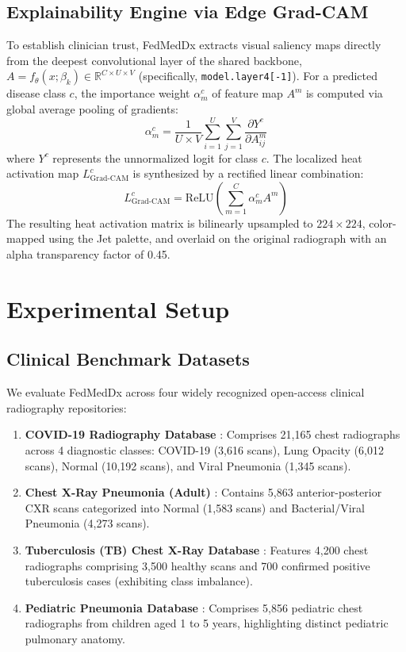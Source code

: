 \documentclass[conference]{IEEEtran}
\newcommand{\compactitems}{%
  \setlength{\itemsep}{1.2pt}%
  \setlength{\parskip}{0pt}%
  \setlength{\parsep}{0pt}%
  \setlength{\topsep}{2pt}%
  \setlength{\partopsep}{0pt}%
}
\begin{document}
\subsection{Explainability Engine via Edge Grad-CAM}
To establish clinician trust, FedMedDx extracts visual saliency maps directly from the deepest convolutional layer of the shared backbone, $A = f_\theta(x; \beta_k) \in \mathbb{R}^{C \times U \times V}$ (specifically, \texttt{model.layer4[-1]}). For a predicted disease class $c$, the importance weight $\alpha_m^c$ of feature map $A^m$ is computed via global average pooling of gradients:
\begin{equation}
    \alpha_m^c = \frac{1}{U \times V} \sum_{i=1}^U \sum_{j=1}^V \frac{\partial Y^c}{\partial A_{ij}^m}
\end{equation}
where $Y^c$ represents the unnormalized logit for class $c$. The localized heat activation map $L_{\text{Grad-CAM}}^c$ is synthesized by a rectified linear combination:
\begin{equation}
    L_{\text{Grad-CAM}}^c = \text{ReLU}\left(\sum_{m=1}^C \alpha_m^c A^m\right)
\end{equation}
The resulting heat activation matrix is bilinearly upsampled to $224 \times 224$, color-mapped using the Jet palette, and overlaid on the original radiograph with an alpha transparency factor of 0.45.

\section{Experimental Setup}

\subsection{Clinical Benchmark Datasets}
We evaluate FedMedDx across four widely recognized open-access clinical radiography repositories:
\begin{enumerate}\compactitems
    \item \textbf{COVID-19 Radiography Database} \cite{chowdhury2020can}: Comprises 21,165 chest radiographs across 4 diagnostic classes: COVID-19 (3,616 scans), Lung Opacity (6,012 scans), Normal (10,192 scans), and Viral Pneumonia (1,345 scans).
    \item \textbf{Chest X-Ray Pneumonia (Adult)} \cite{kermany2018identifying}: Contains 5,863 anterior-posterior CXR scans categorized into Normal (1,583 scans) and Bacterial/Viral Pneumonia (4,273 scans).
    \item \textbf{Tuberculosis (TB) Chest X-Ray Database} \cite{chowdhury2020can}: Features 4,200 chest radiographs comprising 3,500 healthy scans and 700 confirmed positive tuberculosis cases (exhibiting class imbalance).
    \item \textbf{Pediatric Pneumonia Database} \cite{kermany2018identifying}: Comprises 5,856 pediatric chest radiographs from children aged 1 to 5 years, highlighting distinct pediatric pulmonary anatomy.
\end{enumerate}
\end{document}

